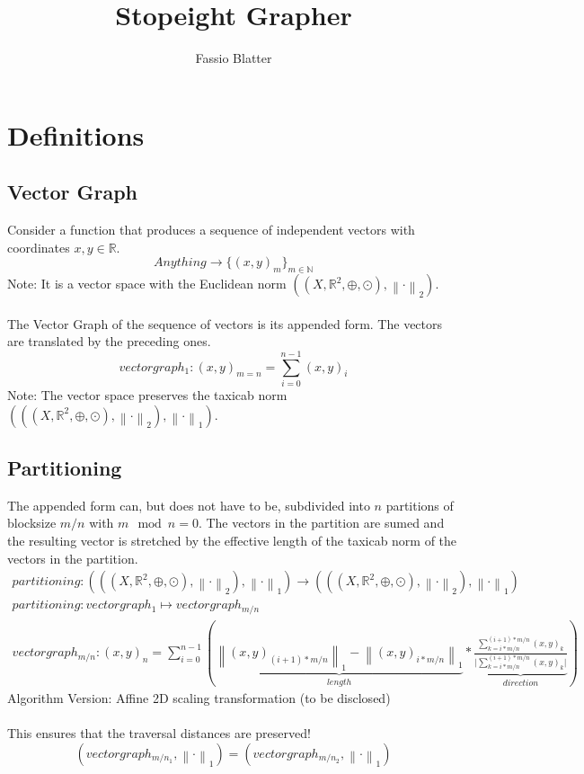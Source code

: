 \documentclass{report}
\newcommand\norm[1]{\left\lVert#1\right\rVert}
\begin{document}
\title{Stopeight Grapher}
\author{Fassio Blatter}
\maketitle

\chapter{Definitions}
\section{Vector Graph}
Consider a function that produces a sequence of independent vectors with coordinates $x,y \in \mathbb{R}$.
\begin{equation}
Anything \rightarrow \{(x,y)_{m}\}_{m \in \mathbb{N}}
\end{equation}
Note: It is a vector space with the Euclidean norm $((X,\mathbb{R}^2,\oplus,\odot),\norm{\cdot}_2)$.\\\\
The Vector Graph of the sequence of vectors is its appended form. The vectors are translated by the preceding ones.\\
\begin{equation}
vectorgraph_{1}: (x,y)_{m=n}=\sum_{i=0}^{n-1} (x,y)_{i}
\end{equation}
Note: The vector space preserves the taxicab norm $(((X,\mathbb{R}^2,\oplus,\odot),\norm{\cdot}_2),\norm{\cdot}_1)$.
\section{Partitioning}
The appended form can, but does not have to be, subdivided into $n$ partitions of blocksize $m/n$ with $m\mod n=0$. The vectors in the partition are sumed and the resulting vector is stretched by the effective length of the taxicab norm of the vectors in the partition.
\begin{align}
partitioning: (((X,\mathbb{R}^2,\oplus,\odot),\norm{\cdot}_2),\norm{\cdot}_1) \rightarrow (((X,\mathbb{R}^2,\oplus,\odot),\norm{\cdot}_2),\norm{\cdot}_1)\\
partitioning: vectorgraph_{1} \mapsto vectorgraph_{m/n}\\
vectorgraph_{m/n}:(x,y)_{n}=\sum_{i=0}^{n-1} (\underbrace{\norm{(x,y)_{(i+1)*m/n}}_{1} - \norm{(x,y)_{i*m/n}}_{1}}_{length} * \underbrace{\frac{\sum_{k=i*m/n}^{(i+1)*m/n} (x,y)_{k}}{\vert \sum_{k=i*m/n}^{(i+1)*m/n} (x,y)_{k} \vert}}_{direction})
\end{align}
Algorithm Version: Affine 2D scaling transformation (to be disclosed)\\\\
This ensures that the traversal distances are preserved!
\begin{equation}
(vectorgraph_{m/n_{1}},\norm{\cdot}_{1})=(vectorgraph_{m/n_{2}},\norm{\cdot}_{1})
\end{equation}
\end{document}
